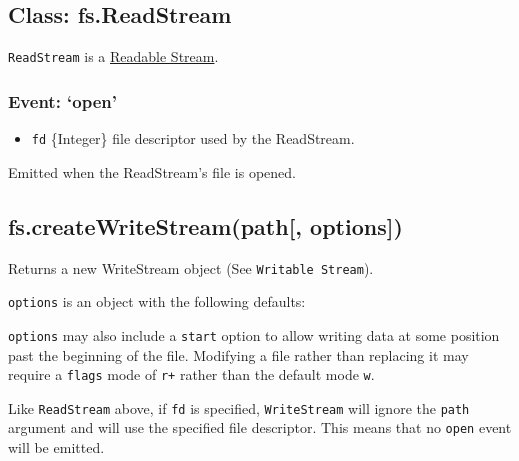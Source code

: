 \subsection{Class: fs.ReadStream}\label{class-fs.readstream}

\texttt{ReadStream} is a
\href{stream.html\#stream_class_stream_readable}{Readable Stream}.

\subsubsection{\texorpdfstring{Event:
`open'}{Event: open}}\label{event-open}

\begin{itemize}
\itemsep1pt\parskip0pt
\item
  \texttt{fd} \{Integer\} file descriptor used by the ReadStream.
\end{itemize}

Emitted when the ReadStream's file is opened.

\subsection{fs.createWriteStream(path{[},
options{]})}\label{fs.createwritestreampath-options}

Returns a new WriteStream object (See \texttt{Writable\ Stream}).

\texttt{options} is an object with the following defaults:

\begin{Shaded}
\begin{Highlighting}[]
\NormalTok{\{ }\NormalTok{: }\NormalTok{,}
  \NormalTok{: }\NormalTok{,}
  \NormalTok{: }\NormalTok{,}
  \NormalTok{: } \NormalTok{\}}
\end{Highlighting}
\end{Shaded}

\texttt{options} may also include a \texttt{start} option to allow
writing data at some position past the beginning of the file. Modifying
a file rather than replacing it may require a \texttt{flags} mode of
\texttt{r+} rather than the default mode \texttt{w}.

Like \texttt{ReadStream} above, if \texttt{fd} is specified,
\texttt{WriteStream} will ignore the \texttt{path} argument and will use
the specified file descriptor. This means that no \texttt{open} event
will be emitted.


